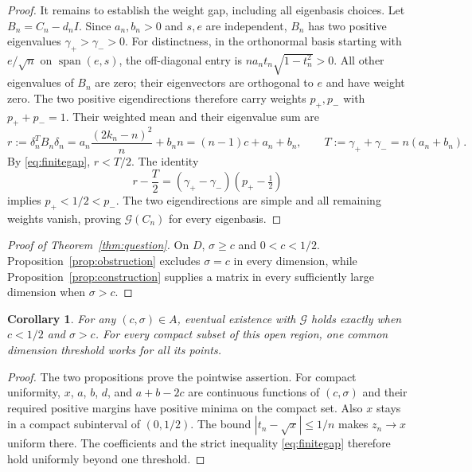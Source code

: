 \documentclass[11pt]{article}
\newtheorem{corollary}[theorem]{Corollary}
\newcommand{\G}{\mathcal G}
\begin{document}
\begin{proof}
It remains to establish the weight gap, including all eigenbasis choices.
Let $B_n=C_n-d_nI$. Since $a_n,b_n>0$ and $s,e$ are independent,
$B_n$ has two positive eigenvalues $\gamma_+>\gamma_->0$.
For distinctness, in the orthonormal basis starting with $e/\sqrt n$
on $\operatorname{span}(e,s)$, the off-diagonal entry is
$na_nt_n\sqrt{1-t_n^2}>0$. All other eigenvalues of $B_n$ are zero;
their eigenvectors are orthogonal to $e$ and have weight zero.
The two positive eigendirections therefore carry weights $p_+,p_-$
with $p_++p_-=1$. Their weighted mean and their eigenvalue sum are
\[
 r:=\delta_n^TB_n\delta_n
 =a_n\frac{(2k_n-n)^2}{n}+b_nn
 =(n-1)c+a_n+b_n,\qquad
 T:=\gamma_++\gamma_-=n(a_n+b_n).
\]
By \eqref{eq:finitegap}, $r<T/2$. The identity
\[
 r-\frac T2=(\gamma_+-\gamma_-)(p_+-\tfrac12)
\]
implies $p_+<1/2<p_-$. The two eigendirections are simple and
all remaining weights vanish, proving $\G(C_n)$ for every eigenbasis.
\end{proof}

\begin{proof}[Proof of Theorem~\ref{thm:question}]
On $D$, $\sigma\ge c$ and $0<c<1/2$.
Proposition~\ref{prop:obstruction} excludes $\sigma=c$ in every
dimension, while Proposition~\ref{prop:construction} supplies a matrix
in every sufficiently large dimension when $\sigma>c$.
\end{proof}

\begin{corollary}\label{cor:all}
For any $(c,\sigma)\in A$, eventual existence with $\G$ holds
exactly when $c<1/2$ and $\sigma>c$.
For every compact subset of this open region, one common dimension
threshold works for all its points.
\end{corollary}
\begin{proof}
The two propositions prove the pointwise assertion.
For compact uniformity, $x$, $a$, $b$, $d$, and $a+b-2c$ are continuous
functions of $(c,\sigma)$ and their required positive margins have
positive minima on the compact set. Also $x$ stays in a compact
subinterval of $(0,1/2)$. The bound
$|t_n-\sqrt{x}|\le1/n$ makes $z_n\to x$ uniform there. The
coefficients and the strict inequality \eqref{eq:finitegap} therefore
hold uniformly beyond one threshold.
\end{proof}
\end{document}
